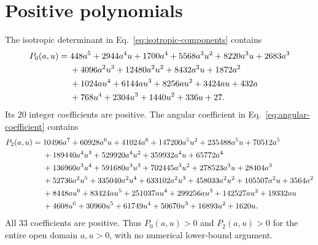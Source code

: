 \documentclass[aps,pre,reprint,amsmath,amssymb,superscriptaddress,nofootinbib]{revtex4-2}
\begin{document}
\onecolumngrid
\section{Positive polynomials}
\label{app:polynomials}

The isotropic determinant in Eq.~\eqref{eq:isotropic-components} contains
\begin{align}
P_0(a,u)={}&448a^5+2944a^4u+1700a^4+5568a^3u^2+8220a^3u+2683a^3\notag\\
&+4096a^2u^3+12480a^2u^2+8432a^2u+1872a^2\notag\\
&+1024au^4+6144au^3+8256au^2+3424au+432a\notag\\
&+768u^4+2304u^3+1440u^2+336u+27.
\label{eq:P0}
\end{align}
Its 20 integer coefficients are positive.  The angular coefficient in
Eq.~\eqref{eq:angular-coefficient} contains
\begin{align}
P_2(a,u)={}&10496a^7+60928a^6u+41024a^6
+147200a^5u^2+235488a^5u+70512a^5\notag\\
&+189440a^4u^3+529920a^4u^2+359932a^4u+65772a^4\notag\\
&+136960a^3u^4+591680a^3u^3+702445a^3u^2
+278523a^3u+28404a^3\notag\\
&+52736a^2u^5+335040a^2u^4+633102a^2u^3+458033a^2u^2
+105507a^2u+3564a^2\notag\\
&+8448au^6+83424au^5+251037au^4+299256au^3
+142527au^2+19332au\notag\\
&+4608u^6+30960u^5+61749u^4+50670u^3+16893u^2+1620u.
\label{eq:P2}
\end{align}
All 33 coefficients are positive.  Thus $P_0(a,u)>0$ and $P_2(a,u)>0$
for the entire open domain $a,u>0$, with no numerical lower-bound argument.

\twocolumngrid

\end{document}
